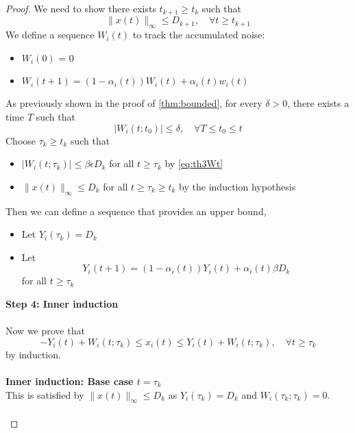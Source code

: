\begin{proof}
    We need to show there exists $t_{k+1}\ge t_k$ such that 
    $$
    \|x(t)\|_\infty \le D_{k+1},\quad \forall t\ge t_{k+1}
    $$
    We define a sequence $W_i(t)$ to track the accumulated noise:
    \begin{itemize}
        \item $W_i(0)$ = 0
        \item $W_i(t+1) = (1-\alpha_i(t))W_i(t) + \alpha_i(t)w_i(t)$
    \end{itemize}
    As previously shown in the proof of \autoref{thm:bounded}, for every $\delta>0$, there exists a time $T$ such that
    \begin{equation}\label{eq:th3Wt}
         |W_i(t;t_0)|\le \delta,\quad \forall T\le t_0\le t
    \end{equation}
    Choose $\tau_k\ge t_k$ such that
    \begin{itemize}
        \item $|W_i(t;\tau_k)|\le \beta\epsilon D_k$ for all $t\ge \tau_k$ by \autoref{eq:th3Wt}\\
        \item $\|x(t)\|_\infty \le D_k$ for all $t\ge \tau_k\ge t_k$ by the induction hypothesis
    \end{itemize}
    Then we can define a sequence that provides an upper bound, 
    \begin{itemize}
        \item Let $Y_i(\tau_k) = D_k$
        \item Let 
        \begin{equation}\label{eq:Yrecusive}
            Y_i(t+1) = (1-\alpha_i(t))Y_i(t)+\alpha_i(t)\beta D_k
        \end{equation}
        for all $t\ge \tau_k$
    \end{itemize}
    \textbf{Step 4: Inner induction}\\
    \\
    Now we prove that 
    \begin{equation}\label{eq:lemma8induction}
     -Y_i(t) + W_i(t;\tau_k)\le x_i(t)\le Y_i(t) + W_i(t;\tau_k),\quad \forall t\ge \tau_k   
    \end{equation}
    by induction.\\
    \\
    \textbf{Inner induction: Base case $t= \tau_k$}\\
    This is satisfied by $\|x(t)\|_\infty \le D_k$ as $Y_i(\tau_k)=D_k$ and $W_i(\tau_k;\tau_k)=0$.\\
    \\

\end{proof}
